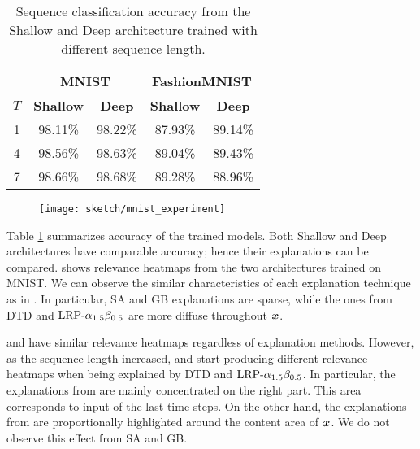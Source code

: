 \renewcommand{\arraystretch}{1.5}
\begin{table}[]
\centering
\begin{tabular}{cc|c|c|c|}
\cline{2-5}
& \multicolumn{2}{|c|}{\textbf{MNIST}} & \multicolumn{2}{|c|}{\textbf{FashionMNIST}} \\ \hline
\multicolumn{1}{|c|}{$T$}   & \multicolumn{1}{c|}{\textbf{Shallow}} & \multicolumn{1}{c|}{\textbf{Deep}} & \multicolumn{1}{c|}{\textbf{Shallow}} & \multicolumn{1}{c|}{\textbf{Deep}} \\ \hline
\multicolumn{1}{|c|}{1} & 98.11\%   & 98.22\% & 87.93\%  & 89.14\%                           \\
\multicolumn{1}{|c|}{4} & 98.56\% & 98.63\%  & 89.04\%  & 89.43\%                            \\
\multicolumn{1}{|c|}{7} & 98.66\%  & 98.68\% & 89.28\%  & 88.96\%  \\ \hline
\end{tabular}
\caption{Sequence classification accuracy from the Shallow and Deep architecture trained with different sequence length.}
\label{tab:mnist_model_acc}
\end{table}
\renewcommand{\arraystretch}{1}



 \begin{figure}[!htb]
\centering
\texttt{[image: sketch/mnist\_experiment]}
\label{fig:mnist_experiment}
\end{figure}


Table \ref{tab:mnist_model_acc} summarizes accuracy of the trained models. Both Shallow and Deep architectures have comparable accuracy; hence their explanations can be compared. \addfigure{\ref{fig:mnist_experiment}} shows relevance heatmaps from the two architectures trained on MNIST.  We can observe the similar characteristics of each explanation technique as in \addfigure{\ref{fig:lenet_heatmaps}}. In particular, SA and GB explanations are sparse, while the ones from DTD and $\text{LRP-}\alpha_{1.5}\beta_{0.5}$ are more diffuse throughout $\boldsymbol{x}$. 

  and  have similar relevance heatmaps regardless of explanation methods.  However, as the sequence length increased,  and   start producing  different relevance heatmaps when being explained by DTD and $\text{LRP-}\alpha_{1.5}\beta_{0.5}$.  In particular,  the explanations from   are mainly concentrated on the right part. This area corresponds to input of the last time steps. On the other hand,  the explanations from  are proportionally  highlighted around the content area of $\boldsymbol{x}$. We do not observe this effect from SA and GB.



